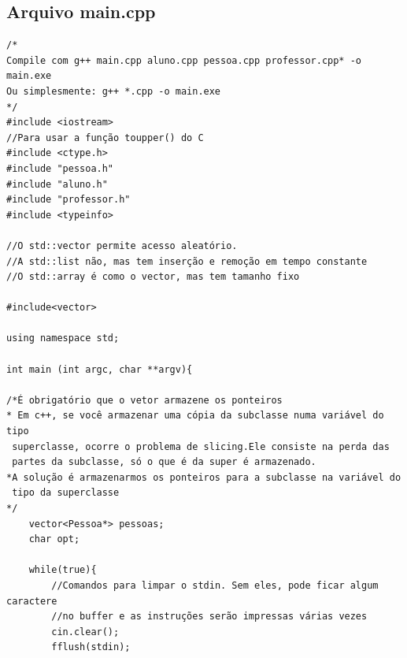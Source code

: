 \documentclass[12pt,a4paper]{article}
\begin{document}
\subsection*{Arquivo main.cpp}
\begin{verbatim}
/*
Compile com g++ main.cpp aluno.cpp pessoa.cpp professor.cpp* -o main.exe
Ou simplesmente: g++ *.cpp -o main.exe
*/
#include <iostream>
//Para usar a função toupper() do C
#include <ctype.h>
#include "pessoa.h"
#include "aluno.h"
#include "professor.h"
#include <typeinfo>

//O std::vector permite acesso aleatório. 
//A std::list não, mas tem inserção e remoção em tempo constante
//O std::array é como o vector, mas tem tamanho fixo

#include<vector>

using namespace std;

int main (int argc, char **argv){

/*É obrigatório que o vetor armazene os ponteiros 
* Em c++, se você armazenar uma cópia da subclasse numa variável do tipo 
 superclasse, ocorre o problema de slicing.Ele consiste na perda das
 partes da subclasse, só o que é da super é armazenado. 
*A solução é armazenarmos os ponteiros para a subclasse na variável do 
 tipo da superclasse
*/
    vector<Pessoa*> pessoas;
    char opt;

    while(true){
        //Comandos para limpar o stdin. Sem eles, pode ficar algum caractere
        //no buffer e as instruções serão impressas várias vezes
        cin.clear();
        fflush(stdin);


\end{verbatim}
\end{document}
